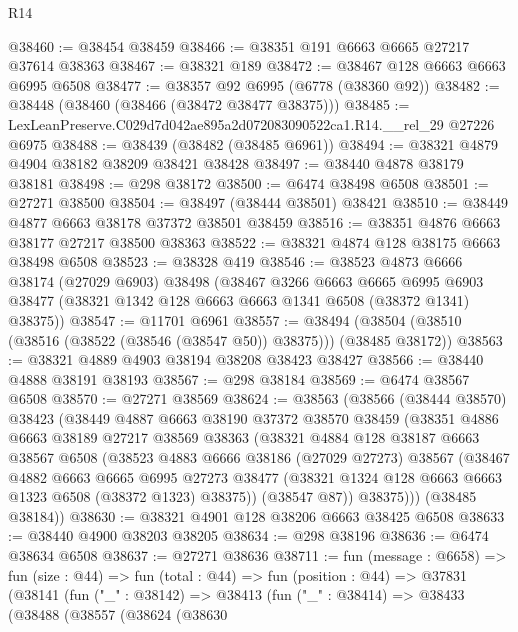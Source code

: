 \begin{lexlean}{R14}
\begin{coremodule}
@38460 := @38454 @38459
@38466 := @38351 @191 @6663 @6665 @27217 @37614 @38363
@38467 := @38321 @189
@38472 := @38467 @128 @6663 @6663 @6995 @6508
@38477 := @38357 @92 @6995 (@6778 (@38360 @92))
@38482 := @38448 (@38460 (@38466 (@38472 @38477 @38375)))
@38485 := LexLeanPreserve.C029d7d042ae895a2d072083090522ca1.R14.__rel_29 @27226 @6975
@38488 := @38439 (@38482 (@38485 @6961))
@38494 := @38321 @4879 @4904 @38182 @38209 @38421 @38428
@38497 := @38440 @4878 @38179 @38181
@38498 := @298 @38172
@38500 := @6474 @38498 @6508
@38501 := @27271 @38500
@38504 := @38497 (@38444 @38501) @38421
@38510 := @38449 @4877 @6663 @38178 @37372 @38501 @38459
@38516 := @38351 @4876 @6663 @38177 @27217 @38500 @38363
@38522 := @38321 @4874 @128 @38175 @6663 @38498 @6508
@38523 := @38328 @419
@38546 := @38523
    @4873
    @6666
    @38174
    (@27029 @6903)
    @38498
    (@38467
      @3266
      @6663
      @6665
      @6995
      @6903
      @38477
      (@38321 @1342 @128 @6663 @6663 @1341 @6508 (@38372 @1341) @38375))
@38547 := @11701 @6961
@38557 := @38494 (@38504 (@38510 (@38516 (@38522 (@38546 (@38547 @50)) @38375))) (@38485 @38172))
@38563 := @38321 @4889 @4903 @38194 @38208 @38423 @38427
@38566 := @38440 @4888 @38191 @38193
@38567 := @298 @38184
@38569 := @6474 @38567 @6508
@38570 := @27271 @38569
@38624 := @38563
    (@38566
      (@38444 @38570)
      @38423
      (@38449
        @4887
        @6663
        @38190
        @37372
        @38570
        @38459
        (@38351
          @4886
          @6663
          @38189
          @27217
          @38569
          @38363
          (@38321
            @4884
            @128
            @38187
            @6663
            @38567
            @6508
            (@38523
              @4883
              @6666
              @38186
              (@27029 @27273)
              @38567
              (@38467
                @4882
                @6663
                @6665
                @6995
                @27273
                @38477
                (@38321 @1324 @128 @6663 @6663 @1323 @6508 (@38372 @1323) @38375))
              (@38547 @87))
            @38375)))
      (@38485 @38184))
@38630 := @38321 @4901 @128 @38206 @6663 @38425 @6508
@38633 := @38440 @4900 @38203 @38205
@38634 := @298 @38196
@38636 := @6474 @38634 @6508
@38637 := @27271 @38636
@38711 := fun (message : @6658) =>
  fun (size : @44) =>
  fun (total : @44) =>
  fun (position : @44) =>
  @37831
    (@38141
      (fun ("_" : @38142) =>
      @38413
        (fun ("_" : @38414) =>
        @38433
          (@38488
            (@38557
              (@38624
                (@38630

\end{coremodule}
\end{lexlean}
